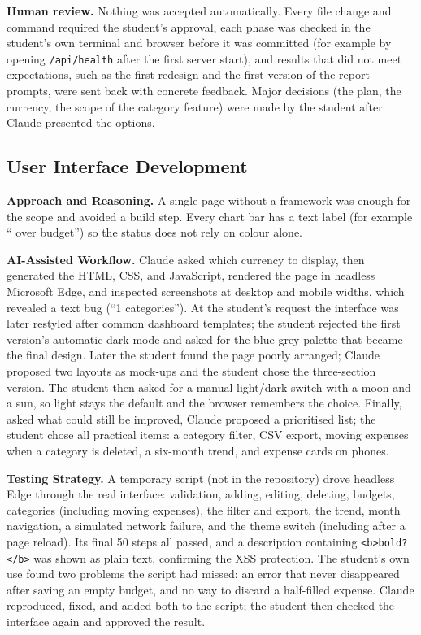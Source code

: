 \documentclass[11pt,a4paper]{article}
\begin{document}
\textbf{Human review.} Nothing was accepted automatically. Every file
change and command required the student's approval, each phase was
checked in the student's own terminal and browser before it was
committed (for example by opening \texttt{/api/health} after the first
server start), and results that did not meet expectations, such as the
first redesign and the first version of the report prompts, were sent
back with concrete feedback. Major decisions (the plan, the currency, the
scope of the category feature) were made by the student after Claude
presented the options.

\subsection{User Interface Development}

\textbf{Approach and Reasoning.} A single page without a framework was
enough for the scope and avoided a build step. Every chart bar has a
text label (for example `` over budget'') so the status
does not rely on colour alone.

\textbf{AI-Assisted Workflow.} Claude asked which currency to display,
then generated the HTML, CSS, and JavaScript, rendered the page in
headless Microsoft Edge, and inspected screenshots at desktop and mobile
widths, which revealed a text bug (``1 categories''). At the student's
request the interface was later restyled after common dashboard
templates; the student rejected the first version's automatic dark mode
and asked for the blue-grey palette that became the final design. Later
the student found the page poorly arranged; Claude proposed two layouts
as mock-ups and the student chose the three-section version. The student
then asked for a manual light/dark switch with a moon and a sun, so light
stays the default and the browser remembers the choice. Finally, asked
what could still be improved, Claude proposed a prioritised list; the
student chose all practical items: a category filter, CSV export, moving
expenses when a category is deleted, a six-month trend, and expense cards
on phones.

\textbf{Testing Strategy.} A temporary script (not in the repository)
drove headless Edge through the real interface: validation, adding,
editing, deleting, budgets, categories (including moving expenses), the
filter and export, the trend, month navigation, a simulated network
failure, and the theme switch (including after a page reload).
Its final 50 steps all passed, and a description
containing \texttt{<b>bold?</b>} was shown as plain text, confirming the
XSS protection. The student's own use found two problems the script had
missed: an error that never disappeared after saving an empty budget,
and no way to discard a half-filled expense. Claude reproduced, fixed,
and added both to the script; the student then checked the interface
again and approved the result.
\end{document}
